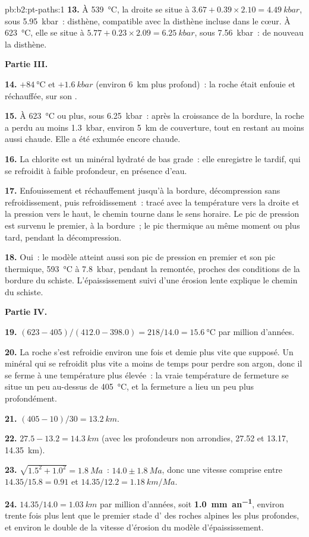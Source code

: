 \begin{solution}{pb:b2:pt-paths:1}
\textbf{13.} À \qty{539}{\celsius}, la droite se situe à $3.67 + 0.39\times2.10 =
\qty{4.49}{kbar}$, sous \qty{5.95}{kbar}~: disthène, compatible avec la disthène incluse
dans le cœur. À \qty{623}{\celsius}, elle se situe à $5.77 + 0.23\times2.09 = \qty{6.25}{kbar}$,
sous \qty{7.56}{kbar}~: de nouveau la disthène.

\noindent\textbf{Partie III.}

\textbf{14.} $+\qty{84}{\celsius}$ et $+\qty{1.6}{kbar}$ (environ \qty{6}{km} plus profond)~: la
roche était enfouie et réchauffée, sur son .

\textbf{15.} À \qty{623}{\celsius} ou plus, sous \qty{6.25}{kbar}~: après la croissance de la bordure, la
roche a perdu au moins \qty{1.3}{kbar}, environ \qty{5}{km} de couverture, tout en restant au moins
aussi chaude. Elle a été exhumée encore chaude.

\textbf{16.} La chlorite est un minéral hydraté de bas grade~: elle enregistre le  tardif,
qui se refroidit à faible profondeur, en présence d'eau.

\textbf{17.} Enfouissement et réchauffement jusqu'à la bordure, décompression sans refroidissement, puis refroidissement~:
tracé avec la température vers la droite et la pression vers le haut, le chemin tourne dans le sens horaire. Le
pic de pression est survenu le premier, à la bordure~; le pic thermique au même moment ou plus tard, pendant la
décompression.

\textbf{18.} Oui~: le modèle atteint aussi son pic de pression en premier et son pic thermique,
\qty{593}{\celsius} à \qty{7.8}{kbar}, pendant la remontée, proches des conditions de la bordure
du schiste. L'épaississement suivi d'une érosion lente explique le chemin du schiste.

\noindent\textbf{Partie IV.}

\textbf{19.} $(623 - 405)/(412.0 - 398.0) = 218/14.0 = \qty{15.6}{\celsius}$ par million
d'années.

\textbf{20.} La roche s'est refroidie environ une fois et demie plus vite que supposé. Un minéral
qui se refroidit plus vite a moins de temps pour perdre son argon, donc il se ferme à une température plus élevée~:
la vraie température de fermeture se situe un peu au-dessus de \qty{405}{\celsius}, et la fermeture
a lieu un peu plus profondément.

\textbf{21.} $(405 - 10)/30 = \qty{13.2}{km}$.

\textbf{22.} $27.5 - 13.2 = \qty{14.3}{km}$ (avec les profondeurs non arrondies, 27.52 et 13.17,
\qty{14.35}{km}).

\textbf{23.} $\sqrt{1.5^2 + 1.0^2} = \qty{1.8}{Ma}$~: $14.0 \pm \qty{1.8}{Ma}$, donc une vitesse
comprise entre $14.35/15.8 = 0.91$ et $14.35/12.2 = \qty{1.18}{km/Ma}$.

\textbf{24.} $14.35/14.0 = \qty{1.03}{km}$ par million d'années, soit
\textbf{\qty[text-series-to-math=true]{1.0}{mm.an^{-1}}}, environ trente fois plus lent que
le premier stade d' des roches alpines les plus profondes, et environ le double de la vitesse d'érosion
du modèle d'épaississement.
\end{solution}
